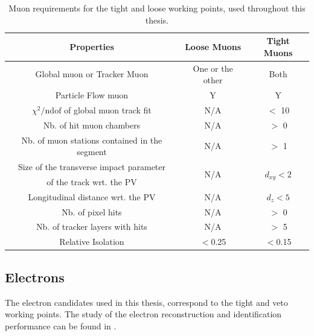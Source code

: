 \begin{table}[htbp]
	\centering
	\caption{Muon requirements for the tight and loose working points, used throughout this thesis.}
	\begin{tabular}{ccc}
		\toprule
		Properties & Loose Muons & Tight Muons \\ 
		\midrule 
		Global muon or Tracker Muon & One or the other & Both \\ 
	
		Particle Flow muon & Y & Y \\ 
		
		$\chi^2/\mathrm{ndof}$ of global muon track fit & N/A & $<$ 10 \\ 
	
		Nb. of hit muon chambers & N/A & $>$ 0 \\ 
		
		Nb. of muon stations contained in the segment & N/A & $>$ 1  \\ 
		
		 Size of the transverse impact parameter  & \multirow{2}{*}{N/A }& \multirow{2}{*}{$d_{xy} < 2$ \mm} \\ 
	 of the track wrt. the PV & & \\
		Longitudinal distance wrt. the PV & N/A & $d_z < 5$ \mm \\ 
		
		Nb. of pixel hits & N/A & $>$ 0 \\ 
		
		Nb. of tracker layers with hits & N/A & $>$ 5 \\ 
	
		Relative Isolation & $<$0.25 & $<$0.15 \\
		\bottomrule
	\end{tabular} 
	
	\label{tab:MuonReq}
\end{table}


\newpage
\subsection{Electrons}
\label{sec:ElectronID}
The electron candidates used in this thesis, correspond to the tight and veto working points. The study of the electron reconstruction and identification performance can be found in \cite{CMS-DP-2017-004}.


